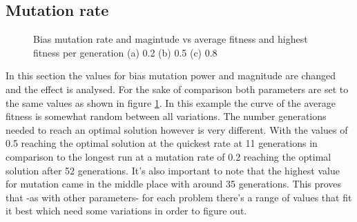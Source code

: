 \documentclass[conference]{IEEEtran}
\begin{document}
\subsection{Mutation rate}
\begin{figure}[h!]
	\centering
	\caption{Bias mutation rate and magintude vs average fitness and highest fitness per generation (a) 0.2  (b) 0.5  (c) 0.8}
	\label{fig:mutations}
\end{figure}
In this section the values for bias mutation power and magnitude are changed and the effect is analysed. For the sake of comparison both parameters are set to the same values as shown in figure \ref{fig:mutations}. In this example the curve of the average fitness is somewhat random between all variations. The number generations needed to reach an optimal solution however is very different. With the values of 0.5 reaching the optimal solution at the quickest rate at 11 generations in comparison to the longest run at a mutation rate of 0.2 reaching the optimal solution after 52 generations. It's also important to note that the highest value for mutation came in the middle place with around 35 generations. This proves that -as with other parameters- for each problem there's a range of values that fit it best which need some variations in order to figure out. 
\end{document}
